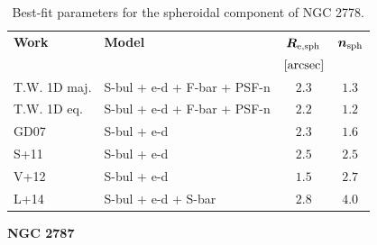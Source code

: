 \documentclass[preprint2]{emulateapj}
\begin{document}
  \begin{table}[h]
  \small
  \caption{Best-fit parameters for the spheroidal component of NGC 2778.}
  \begin{center}
  \begin{tabular}{llcc}
  \hline
  {\bf Work} & {\bf Model}   & $\bm R_{\rm e,sph}$    & $\bm n_{\rm sph}$ \\
    &  &  $[\rm arcsec]$ & \\
  \hline
  T.W. 1D maj. & S-bul + e-d + F-bar + PSF-n & $2.3$  &  $1.3$ \\
  T.W. 1D eq.  & S-bul + e-d + F-bar + PSF-n & $2.2$  &  $1.2$ \\
  \hline
  GD07         & S-bul + e-d	     & $2.3$  &  $1.6$ \\
  S+11         & S-bul + e-d	     & $2.5$  &  $2.5$ \\
  V+12         & S-bul + e-d	     & $1.5$  &  $2.7$ \\
  L+14         & S-bul + e-d + S-bar & $2.8$  &  $4.0$ \\
  \hline
  \end{tabular}
  \end{center}
  \label{tab:n2778}
  \end{table}

  \clearpage\newpage\noindent
  {\bf NGC 2787 \\}
\end{document}
